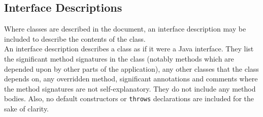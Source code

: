 \subsection{Interface Descriptions}
Where classes are described in the document, an interface description may be included to describe the contents of the class.\\

An interface description describes a class as if it were a Java interface. They list the significant method signatures in the class (notably methods which are depended upon by other parts of the application), any other classes that the class depends on, any overridden method, significant annotations and comments where the method signatures are not self-explanatory. They do not include any method bodies. Also, no default constructors or \texttt{throws} declarations are included for the sake of clarity.

